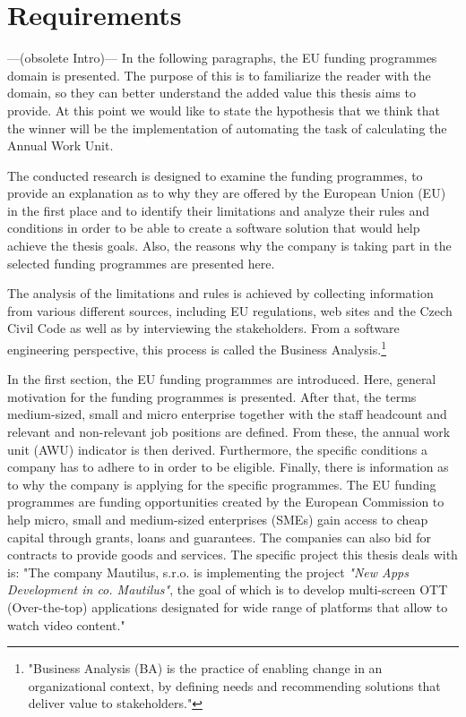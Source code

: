 \documentclass[12pt,oneside]{fithesis2}
\begin{document}
\section{Requirements}\label{hypothesis}
---(obsolete Intro)---
In the following paragraphs, the EU funding programmes domain is presented. The purpose of this is to familiarize the reader with the domain, so they can better understand the added value this thesis aims to provide. At this point we would like to state the hypothesis that we think that the winner will be the implementation of automating the task of calculating the Annual Work Unit.
\par
The conducted research is designed to examine the funding programmes, to provide an explanation as to why they are offered by the European Union (EU) in the first place and to identify their limitations and analyze their rules and conditions in order to be able to create a software solution that would help achieve the thesis goals. Also, the reasons why the company is taking part in the selected funding programmes are presented here.
\par
The analysis of the limitations and rules is achieved by collecting information from various different sources, including EU regulations, web sites and the Czech Civil Code as well as by interviewing the stakeholders. From a software engineering perspective, this process is called the Business Analysis.\footnote{"Business Analysis (BA) is the practice of enabling change in an organizational context, by defining needs and recommending solutions that deliver value to stakeholders."\cite{business-analysis}}
\par
In the first section, the EU funding programmes are introduced. Here, general motivation for the funding programmes is presented. After that, the terms medium-sized, small and micro enterprise together with the staff headcount and relevant and non-relevant job positions are defined. From these, the annual work unit (AWU) indicator is then derived. Furthermore, the specific conditions a company has to adhere to in order to be eligible. Finally, there is information as to why the company is applying for the specific programmes.
\newpage
The EU funding programmes are funding opportunities created by the European Commission to help micro, small and medium-sized enterprises (SMEs) gain access to cheap capital through grants, loans and guarantees. The companies can also bid for contracts to provide goods and services.
The specific project this thesis deals with is: "The company Mautilus, s.r.o. is implementing the project \textit{"New Apps Development in co. Mautilus"}, the goal of which is to develop multi-screen OTT (Over-the-top) applications designated for wide range of platforms that allow to watch video content." \cite{mau-eu-subsidy}
\end{document}

